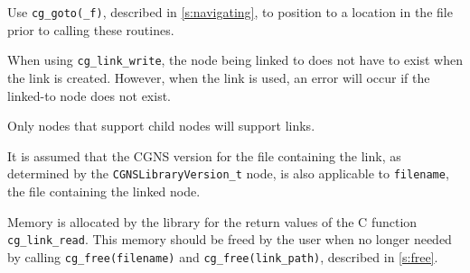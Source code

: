 Use \texttt{cg\_goto(\_f)}, described in \autoref{s:navigating}, to
position to a location in the file prior to calling these routines.

When using \texttt{cg\_link\_write}, the node being linked to does not have 
to exist when the link is created.
However, when the link is used, an error will occur if the linked-to
node does not exist.

Only nodes that support child nodes will support links.

It is assumed that the CGNS version for the file containing the link,
as determined by the \texttt{CGNSLibraryVersion\_t} node, is also
applicable to \texttt{filename}, the file containing the linked node.

Memory is allocated by the library for the return values of the C
function \texttt{cg\_link\_read}.
This memory should be freed by the user when no longer needed by calling
\texttt{cg\_free(filename)} and \texttt{cg\_free(link\_path)}, described
in \autoref{s:free}.
